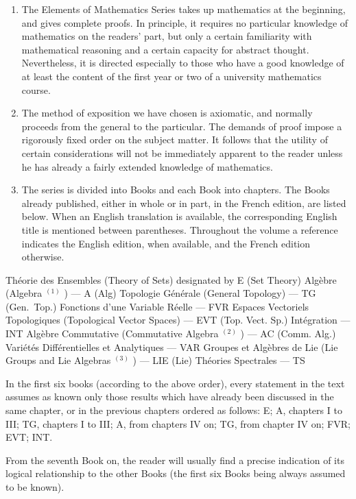 
\begin{enumerate}
\def\labelenumi{\arabic{enumi}.}
\item
  The Elements of Mathematics Series takes up mathematics at the beginning, and gives complete proofs. In principle, it requires no particular knowledge of mathematics on the readers' part, but only a certain familiarity with mathematical reasoning and a certain capacity for abstract thought. Nevertheless, it is directed especially to those who have a good knowledge of at least the content of the first year or two of a university mathematics course.
\item
  The method of exposition we have chosen is axiomatic, and normally proceeds from the general to the particular. The demands of proof impose a rigorously fixed order on the subject matter. It follows that the utility of certain considerations will not be immediately apparent to the reader unless he has already a fairly extended knowledge of mathematics.
\item
  The series is divided into Books and each Book into chapters. The Books already published, either in whole or in part, in the French edition, are listed below. When an English translation is available, the corresponding English title is mentioned between parentheses. Throughout the volume a reference indicates the English edition, when available, and the French edition otherwise.
\end{enumerate}

Théorie des Ensembles (Theory of Sets) designated by E (Set Theory) Algèbre (Algebra \(^{(1)}\) ) --- A (Alg) Topologie Générale (General Topology) --- TG (Gen.~Top.) Fonctions d'une Variable Réelle --- FVR Espaces Vectoriels Topologiques (Topological Vector Spaces) --- EVT (Top. Vect. Sp.) Intégration --- INT Algèbre Commutative (Commutative Algebra \(^{(2)}\) ) --- AC (Comm. Alg.) Variétés Différentielles et Analytiques --- VAR Groupes et Algèbres de Lie (Lie Groups and Lie Algebras \(^{(3)}\) ) --- LIE (Lie) Théories Spectrales --- TS

In the first six books (according to the above order), every statement in the text assumes as known only those results which have already been discussed in the same chapter, or in the previous chapters ordered as follows: E; A, chapters I to III; TG, chapters I to III; A, from chapters IV on; TG, from chapter IV on; FVR; EVT; INT.

From the seventh Book on, the reader will usually find a precise indication of its logical relationship to the other Books (the first six Books being always assumed to be known).

